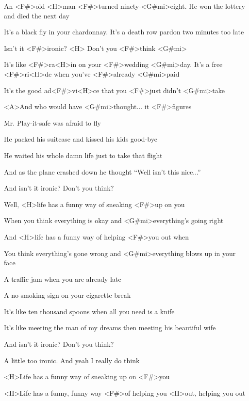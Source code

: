 

\zs
An <F#>old <H>man <F#>turned ninety-<G#mi>eight.
He won the lottery and died the next day

It's a black fly in your chardonnay.
It's a death row pardon two minutes too late

Isn't it <F#>ironic? <H> Don't you <F#>think <G#mi>
\ks

\zr
It's like <F#>ra<H>in on your <F#>wedding <G#mi>day.
It's a free <F#>ri<H>de when you've <F#>already <G#mi>paid

It's the good ad<F#>vi<H>ce that you <F#>just didn't <G#mi>take

<A>And who would have <G#mi>thought... it <F#>figures
\kr

\zs
Mr. Play-it-safe was afraid to fly

He packed his suitcase and kissed his kids good-bye

He waited his whole damn life just to take that flight

And as the plane crashed down he thought ``Well isn't this nice...''

And isn't it ironic? Don't you think?
\ks

\zr \kr

\zs
Well, <H>life has a funny way of sneaking <F#>up on you

When you think everything is okay and <G#mi>everything's going right

And <H>life has a funny way of helping <F#>you out when

You think everything's gone wrong and <G#mi>everything blows up in your face
\ks

\zs
A traffic jam when you are already late

A no-smoking sign on your cigarette break

It's like ten thousand spoons when all you need is a knife

It's like meeting the man of my dreams then meeting his beautiful wife

And isn't it ironic? Don't you think?

A little too ironic. And yeah I really do think
\ks

\zr \kr

\zs
<H>Life has a funny way of sneaking up on <F#>you

<H>Life has a funny, funny way <F#>of helping you <H>out, helping you out
\ks

\kp

